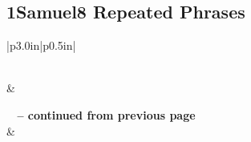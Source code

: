 \subsection{1Samuel8 Repeated Phrases}


\normalsize
 
\begin{center}
\begin{longtable}{|p{3.0in}|p{0.5in}|}
\caption[1Samuel 8 Repeated Phrases]{1Samuel 8 Repeated Phrases}\label{table:Repeated Phrases 1Samuel 8} \\
\hline {} &  \\ \hline 
\endfirsthead
 
{{\bfseries \tablename\ \thetable{} -- continued from previous page}} \\  
\hline {} &  \\ \hline 
\endhead
 

\end{longtable}
\end{center}
